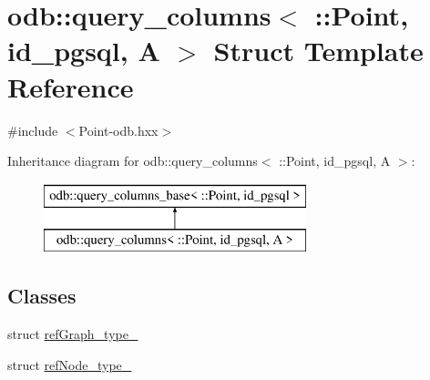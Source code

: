\hypertarget{structodb_1_1query__columns_3_01_1_1_point_00_01id__pgsql_00_01_a_01_4}{}\section{odb\+:\+:query\+\_\+columns$<$ \+:\+:Point, id\+\_\+pgsql, A $>$ Struct Template Reference}
\label{structodb_1_1query__columns_3_01_1_1_point_00_01id__pgsql_00_01_a_01_4}


{\ttfamily \#include $<$Point-\/odb.\+hxx$>$}

Inheritance diagram for odb\+:\+:query\+\_\+columns$<$ \+:\+:Point, id\+\_\+pgsql, A $>$\+:\begin{figure}[H]
\begin{center}
\leavevmode
\includegraphics[height=2.000000cm]{d3/d57/structodb_1_1query__columns_3_01_1_1_point_00_01id__pgsql_00_01_a_01_4}
\end{center}
\end{figure}
\subsection*{Classes}
\begin{DoxyCompactItemize}
\item 
struct \hyperlink{structodb_1_1query__columns_3_01_1_1_point_00_01id__pgsql_00_01_a_01_4_1_1ref_graph__type__}{ref\+Graph\+\_\+type\+\_\+}
\item 
struct \hyperlink{structodb_1_1query__columns_3_01_1_1_point_00_01id__pgsql_00_01_a_01_4_1_1ref_node__type__}{ref\+Node\+\_\+type\+\_\+}
\end{DoxyCompactItemize}
